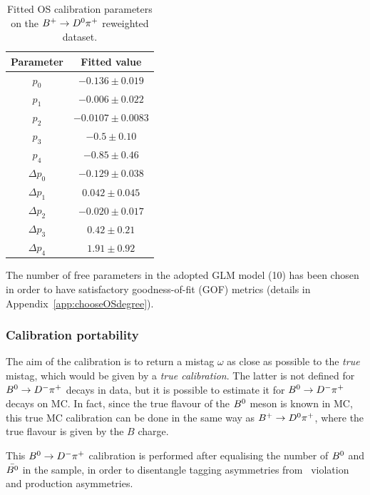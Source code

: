 \begin{table}[htbp]
        \centering
        \caption{Fitted OS calibration parameters on the $B^+\rightarrow D^0\pi^+$ reweighted dataset.}
        \begin{tabular}{cc}
                \toprule
                Parameter & Fitted value \\
                \midrule
                $p_0$ & $-0.136 \pm 0.019$\\
                $p_1$ & $-0.006 \pm 0.022$\\
                $p_2$ & $-0.0107 \pm 0.0083$\\
                $p_3$ & $-0.5 \pm 0.10$\\
                $p_4$ & $-0.85 \pm 0.46$\\
                $\Delta p_0$ & $-0.129 \pm 0.038$\\
                $\Delta p_1$ & $0.042 \pm 0.045$\\
                $\Delta p_2$ & $-0.020 \pm 0.017$\\
                $\Delta p_3$ & $0.42 \pm 0.21$\\
                $\Delta p_4$ & $1.91 \pm 0.92$\\
                \bottomrule
        \end{tabular}
        \label{tab:oscalibparams}
\end{table}
The number of free parameters in the adopted GLM model (10) has been chosen in order to have  
satisfactory goodness-of-fit (GOF) metrics (details in Appendix~\ref{app:chooseOSdegree}).

\subsubsection{Calibration portability}
\label{sec:tagging:OScalib:portability}

The aim of the calibration is to return a mistag $\omega$ as close as possible to the \emph{true} mistag, which would
be given by a \emph{true calibration}. The latter is not defined for $B^0\rightarrow D^-\pi^+$ decays in data, but it is possible to estimate it 
for $B^0\rightarrow D^-\pi^+$ decays on MC. In fact, since the true flavour of the $B^0$ meson
is known in MC, this true MC calibration can be done in the same way as $B^+\rightarrow D^0\pi^+$, where the true flavour is given by the $B$ charge.

This $B^0\rightarrow D^-\pi^+$ calibration is performed after equalising the number of $B^0$ and $\bar{B^0}$ in the sample, in order to disentangle
tagging asymmetries from \CP~violation and production asymmetries.

